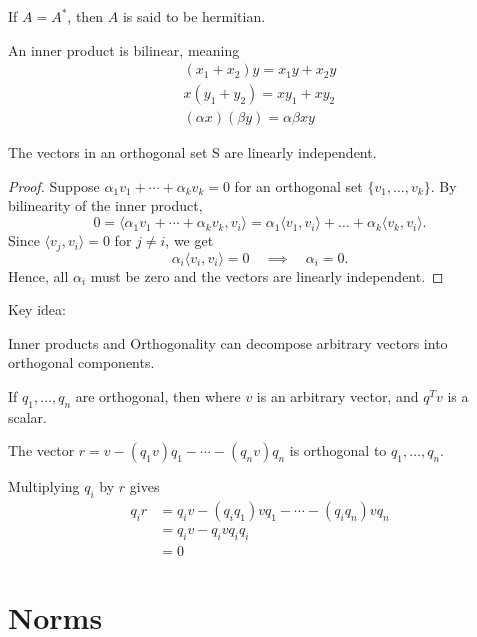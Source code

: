\documentclass[11pt]{article}
\begin{document}
If $A = A^*$, then $A$ is said to be hermitian.

\begin{definition}
  An inner product is bilinear, meaning
  \begin{align*}
    (x_1 + x_2)y = x_1y + x_2y \\
    x(y_1 + y_2) = xy_1 + xy_2 \\
    (\alpha x)(\beta y) = \alpha \beta xy
  \end{align*}
\end{definition}

\begin{theorem}
  The vectors in an orthogonal set S are linearly independent.

  \begin{proof}
  Suppose $\alpha_1 v_1 + \cdots + \alpha_k v_k = 0$ for an orthogonal set $\{v_1, \dots, v_k\}$. By bilinearity of the inner product,
  \[
  0 
  = \langle \alpha_1 v_1 + \cdots + \alpha_k v_k, v_i \rangle 
  = \alpha_1 \langle v_1, v_i \rangle + \dots + \alpha_k \langle v_k, v_i \rangle.
  \]
  Since $\langle v_j, v_i \rangle = 0$ for $j \neq i$, we get
  \[
  \alpha_i \langle v_i, v_i \rangle = 0 \quad \implies \quad \alpha_i = 0.
  \]
  Hence, all $\alpha_i$ must be zero and the vectors are linearly independent.
  \end{proof}
\end{theorem}

Key idea:

Inner products and Orthogonality can decompose arbitrary vectors into orthogonal components.

\begin{theorem}
  If $q_1, \dots, q_n$ are orthogonal, then
  where $v$ is an arbitrary vector, and $q^Tv$ is a scalar.

  The vector $r = v - (q_1v)q_1 - \cdots - (q_nv)q_n$ is orthogonal to $q_1, \dots, q_n$.

  Multiplying $q_i$ by $r$ gives
  \begin{align*}
    q_i r &= q_i v - (q_i q_1)vq_1 - \cdots - (q_i q_n)vq_n \\
    &= q_i v - q_i v q_i q_i \\
    &= 0
  \end{align*}
\end{theorem}

\section{Norms}
\end{document}
